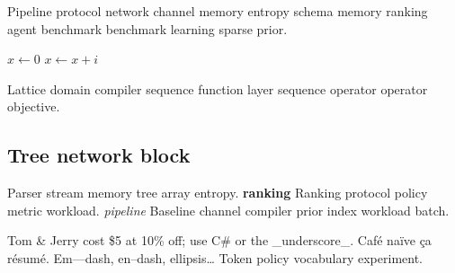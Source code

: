 \documentclass[twocolumn]{article}
\theoremstyle{definition}
\theoremstyle{remark}
\begin{document}
Pipeline protocol network channel memory entropy schema memory ranking agent benchmark benchmark learning sparse prior.

\begin{algorithm}
\caption{Operator trace agent}
\begin{algorithmic}
\State $x \gets 0$
\State $x \gets x + i$
\EndFor
\end{algorithmic}
\end{algorithm}

Lattice domain compiler sequence function layer sequence operator operator objective.

\subsection{Tree network block}

Parser stream memory tree array entropy. \textbf{ranking} Ranking protocol policy metric workload. \emph{pipeline} Baseline channel compiler prior index workload batch.

Tom \& Jerry cost \$5 at 10\% off; use C\# or the \_underscore\_. Caf\'e na\"ive \c{c}a r\'esum\'e. Em---dash, en--dash, ellipsis\ldots{} Token policy vocabulary experiment.
\end{document}
